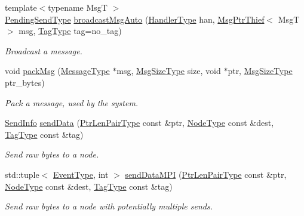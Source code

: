 \begin{DoxyCompactItemize}
{\footnotesize template$<$typename MsgT $>$ }\\\hyperlink{structvt_1_1messaging_1_1_active_messenger_a3626a6ca76d8ad4ec7c3b47a2c70d3a8}{Pending\+Send\+Type} \hyperlink{group__sendpayload_gab11ebaa792d7b87397773347626ad4f9}{broadcast\+Msg\+Auto} (\hyperlink{namespacevt_af64846b57dfcaf104da3ef6967917573}{Handler\+Type} han, \hyperlink{structvt_1_1messaging_1_1_msg_ptr_thief}{Msg\+Ptr\+Thief}$<$ MsgT $>$ msg, \hyperlink{namespacevt_a84ab281dae04a52a4b243d6bf62d0e52}{Tag\+Type} tag=no\+\_\+tag)
\begin{DoxyCompactList}\small\item\em Broadcast a message. \end{DoxyCompactList}\item 
void \hyperlink{structvt_1_1messaging_1_1_active_messenger_a9799bd2681540170faa04b424d3c849e}{pack\+Msg} (\hyperlink{structvt_1_1messaging_1_1_active_messenger_a720a2b1e7462d414b2a51d9fe005eca9}{Message\+Type} $\ast$msg, \hyperlink{namespacevt_a408e86a8c7c89309b52907dc5a513924}{Msg\+Size\+Type} size, void $\ast$ptr, \hyperlink{namespacevt_a408e86a8c7c89309b52907dc5a513924}{Msg\+Size\+Type} ptr\+\_\+bytes)
\begin{DoxyCompactList}\small\item\em Pack a message, used by the system. \end{DoxyCompactList}\item 
\hyperlink{structvt_1_1messaging_1_1_send_info}{Send\+Info} \hyperlink{structvt_1_1messaging_1_1_active_messenger_a98c8e157b97812c677debc8a25ec392d}{send\+Data} (\hyperlink{namespacevt_a97f320a1d3b9b4035e591671cd7d10f0}{Ptr\+Len\+Pair\+Type} const \&ptr, \hyperlink{namespacevt_a866da9d0efc19c0a1ce79e9e492f47e2}{Node\+Type} const \&dest, \hyperlink{namespacevt_a84ab281dae04a52a4b243d6bf62d0e52}{Tag\+Type} const \&tag)
\begin{DoxyCompactList}\small\item\em Send raw bytes to a node. \end{DoxyCompactList}\item 
std\+::tuple$<$ \hyperlink{namespacevt_a009267401def7ae8bf201892222d060f}{Event\+Type}, int $>$ \hyperlink{structvt_1_1messaging_1_1_active_messenger_adb7981ed13c847b01294d240b5c333cb}{send\+Data\+M\+PI} (\hyperlink{namespacevt_a97f320a1d3b9b4035e591671cd7d10f0}{Ptr\+Len\+Pair\+Type} const \&ptr, \hyperlink{namespacevt_a866da9d0efc19c0a1ce79e9e492f47e2}{Node\+Type} const \&dest, \hyperlink{namespacevt_a84ab281dae04a52a4b243d6bf62d0e52}{Tag\+Type} const \&tag)
\begin{DoxyCompactList}\small\item\em Send raw bytes to a node with potentially multiple sends. \end{DoxyCompactList}\item 

\end{DoxyCompactItemize}
